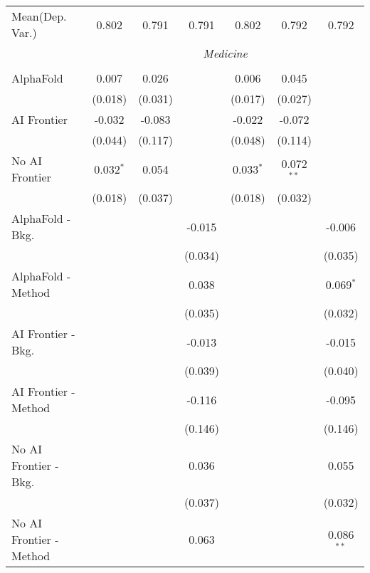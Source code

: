 \begin{tabular}{lcccccc}
Mean(Dep. Var.) & 0.802 & 0.791 & 0.791 & 0.802 & 0.792 & 0.792 \\
 & \multicolumn{6}{c}{\textit{Medicine}} \\ \\
   AlphaFold               & 0.007       & 0.026   &         & 0.006       & 0.045        &   \\   
                           & (0.018)     & (0.031) &         & (0.017)     & (0.027)      &   \\   
   AI Frontier             & -0.032      & -0.083  &         & -0.022      & -0.072       &   \\   
                           & (0.044)     & (0.117) &         & (0.048)     & (0.114)      &   \\   
   No AI Frontier          & 0.032$^{*}$ & 0.054   &         & 0.033$^{*}$ & 0.072$^{**}$ &   \\   
                           & (0.018)     & (0.037) &         & (0.018)     & (0.032)      &   \\   
   AlphaFold - Bkg.        &             &         & -0.015  &             &              & -0.006\\   
                           &             &         & (0.034) &             &              & (0.035)\\   
   AlphaFold - Method      &             &         & 0.038   &             &              & 0.069$^{*}$\\   
                           &             &         & (0.035) &             &              & (0.032)\\   
   AI Frontier - Bkg.      &             &         & -0.013  &             &              & -0.015\\   
                           &             &         & (0.039) &             &              & (0.040)\\   
   AI Frontier - Method    &             &         & -0.116  &             &              & -0.095\\   
                           &             &         & (0.146) &             &              & (0.146)\\   
   No AI Frontier - Bkg.   &             &         & 0.036   &             &              & 0.055\\   
                           &             &         & (0.037) &             &              & (0.032)\\   
   No AI Frontier - Method &             &         & 0.063   &             &              & 0.086$^{**}$\\   

\end{tabular}
